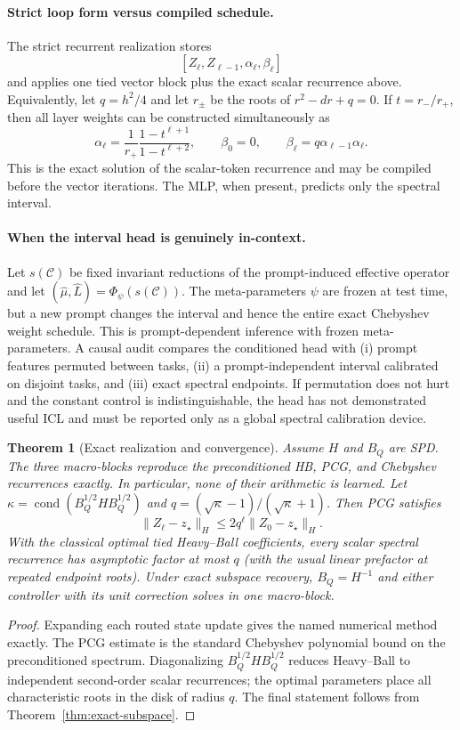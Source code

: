 \documentclass[11pt]{article}
\newtheorem{theorem}{Theorem}
\newcommand{\cond}{\operatorname{cond}}
\begin{document}
\paragraph{Strict loop form versus compiled schedule.}
The strict recurrent realization stores
\[
 [Z_\ell,Z_{\ell-1},\alpha_\ell,\beta_\ell]
\]
and applies one tied vector block plus the exact scalar recurrence above.
Equivalently, let
$q=h^2/4$ and let $r_\pm$ be the roots of $r^2-dr+q=0$.  If
$t=r_-/r_+$, then all layer weights can be constructed simultaneously as
\[
 \alpha_\ell=\frac{1}{r_+}
 \frac{1-t^{\ell+1}}{1-t^{\ell+2}},
 \qquad
 \beta_0=0,
 \qquad
 \beta_\ell=q\alpha_{\ell-1}\alpha_\ell.
\]
This is the exact solution of the scalar-token recurrence and may be compiled
before the vector iterations.  The MLP, when present, predicts only the
spectral interval.

\paragraph{When the interval head is genuinely in-context.}
Let $s(\mathcal C)$ be fixed invariant reductions of the prompt-induced
effective operator and let
$(\widehat\mu,\widehat L)=\Phi_\psi(s(\mathcal C))$.  The meta-parameters
$\psi$ are frozen at test time, but a new prompt changes the interval and hence
the entire exact Chebyshev weight schedule.  This is prompt-dependent inference
with frozen meta-parameters.  A causal audit compares the conditioned
head with (i) prompt features permuted between tasks, (ii) a prompt-independent
interval calibrated on disjoint tasks, and (iii) exact spectral endpoints.
If permutation does not hurt and the constant control is indistinguishable,
the head has not demonstrated useful ICL and must be reported only as a global
spectral calibration device.

\begin{theorem}[Exact realization and convergence]
Assume $H$ and $B_Q$ are SPD.  The three macro-blocks reproduce the
preconditioned HB, PCG, and Chebyshev recurrences exactly.  In particular,
none of their arithmetic is learned.  Let
\(\kappa=\cond(B_Q^{1/2}HB_Q^{1/2})\) and
\(q=(\sqrt\kappa-1)/(\sqrt\kappa+1)\).  Then PCG satisfies
\[
 \|Z_\ell-z_\star\|_H
 \leq 2q^\ell\|Z_0-z_\star\|_H.
\]
With the classical optimal tied Heavy--Ball coefficients, every scalar
spectral recurrence has asymptotic factor at most $q$ (with the usual linear
prefactor at repeated endpoint roots).  Under exact subspace recovery,
$B_Q=H^{-1}$ and either controller with its unit correction solves in one
macro-block.
\end{theorem}
\begin{proof}
Expanding each routed state update gives the named numerical method exactly.
The PCG estimate is the standard Chebyshev polynomial bound on the
preconditioned spectrum.  Diagonalizing
$B_Q^{1/2}HB_Q^{1/2}$ reduces Heavy--Ball to independent second-order scalar
recurrences; the optimal parameters place all characteristic roots in the
disk of radius $q$.  The final statement follows from
Theorem~\ref{thm:exact-subspace}.
\end{proof}
\end{document}
